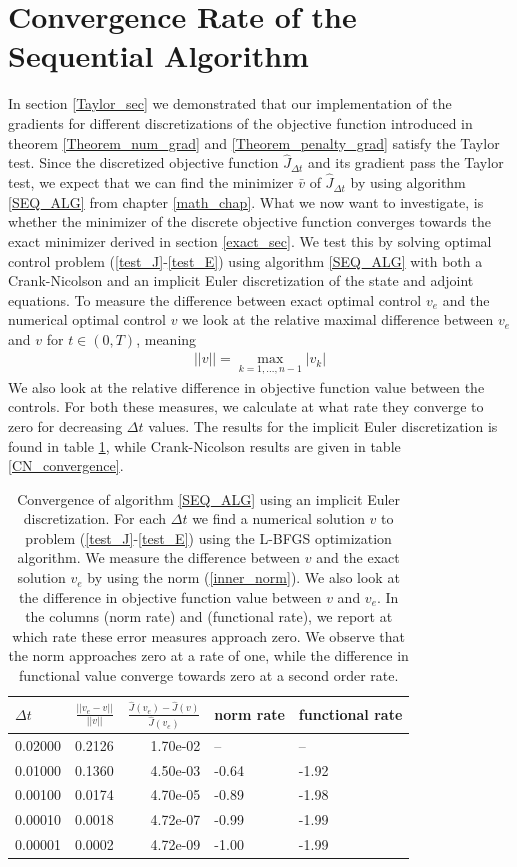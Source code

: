\section{Convergence Rate of the Sequential Algorithm}
In section \ref{Taylor_sec} we demonstrated that our implementation of the gradients for different discretizations of the objective function introduced in theorem \ref{Theorem_num_grad} and \ref{Theorem_penalty_grad} satisfy the Taylor test. Since the discretized objective function $\hat J_{\Delta t}$ and its gradient pass the Taylor test, we expect that we can find the minimizer $\bar v$ of $\hat J_{\Delta t}$ by using algorithm \ref{SEQ_ALG} from chapter \ref{math_chap}. What we now want to investigate, is whether the minimizer of the discrete objective function converges towards the exact minimizer derived in section \ref{exact_sec}. We test this by solving optimal control problem (\ref{test_J}-\ref{test_E}) using algorithm \ref{SEQ_ALG} with both a Crank-Nicolson and an implicit Euler discretization of the state and adjoint equations. To measure the difference between exact optimal control $v_e$ and the numerical optimal control $v$ we look at the relative maximal difference between $v_e$ and $v$ for $t\in(0,T)$, meaning
\begin{align}
||v|| = \max_{k=1,...,n-1}|v_k| \label{inner_norm}
\end{align} 
We also look at the relative difference in objective function value between the controls. For both these measures, we calculate at what rate they converge to zero for decreasing $\Delta t$ values. The results for the implicit Euler discretization is found in table \ref{IE_convergence}, while Crank-Nicolson results are given in table \ref{CN_convergence}.
\\
\begin{table}[!h]
\caption{Convergence of algorithm \ref{SEQ_ALG} using an implicit Euler discretization. For each $\Delta t$ we find a numerical solution $v$ to problem (\ref{test_J}-\ref{test_E}) using the L-BFGS optimization algorithm. We measure the difference between $v$ and the exact solution $v_e$ by using the norm (\ref{inner_norm}). We also look at the difference in objective function value between $v$ and $v_e$. In the columns (norm rate) and (functional rate), we report at which rate these error measures approach zero. We observe that the norm approaches zero at a rate of one, while the difference in functional value converge towards zero at a second order rate.} \label{IE_convergence}
\centering
\begin{tabular}{lrrll}
\toprule
{} $\Delta t$&    $\frac{||v_e-v||}{||v||}$ &  $\frac{\hat J(v_e)-\hat J(v)}{\hat J(v_e)}$ &   norm rate &    functional rate \\
\midrule
0.02000 &  0.2126 &  1.70e-02 &        -- &       -- \\
0.01000 &  0.1360 &  4.50e-03 & -0.64 & -1.92 \\
0.00100 &  0.0174 &  4.70e-05 & -0.89 & -1.98 \\
0.00010 &  0.0018 &  4.72e-07 &   -0.99 & -1.99 \\
0.00001 &  0.0002 &  4.72e-09 &  -1.00 & -1.99 \\
\bottomrule
\end{tabular}
\end{table}
